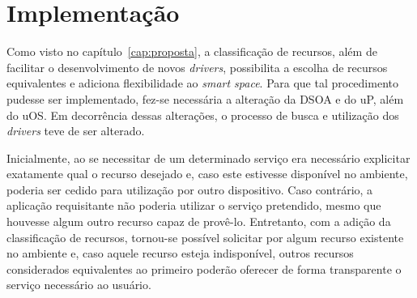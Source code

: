 \chapter{Implementação}

Como visto no capítulo~\ref{cap:proposta}, a classificação de recursos, além de facilitar o desenvolvimento de novos \emph{drivers}, possibilita a escolha de recursos equivalentes e adiciona flexibilidade ao \emph{smart space}. Para que tal procedimento pudesse ser implementado, fez-se necessária a alteração da DSOA e do uP, além do uOS. Em decorrência dessas alterações, o processo de busca e utilização dos \emph{drivers} teve de ser alterado.

Inicialmente, ao se necessitar de um determinado serviço era necessário explicitar exatamente qual o recurso desejado e, caso este estivesse disponível no ambiente, poderia ser cedido para utilização por outro dispositivo. Caso contrário, a aplicação requisitante não poderia utilizar o serviço pretendido, mesmo que houvesse algum outro recurso capaz de provê-lo. Entretanto, com a adição da classificação de recursos, tornou-se possível solicitar por algum recurso existente no ambiente e, caso aquele recurso esteja indisponível, outros recursos considerados equivalentes ao primeiro poderão oferecer de forma transparente o serviço necessário ao usuário.




